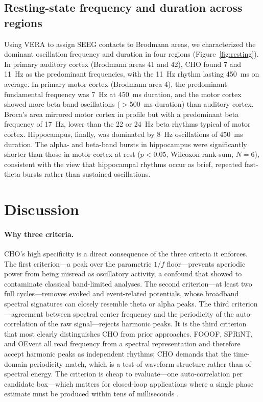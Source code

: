 \documentclass[11pt]{article}
\begin{document}
\subsection{Resting-state frequency and duration across regions}

Using VERA to assign SEEG contacts to Brodmann areas, we characterized the dominant oscillation frequency and duration in four regions (Figure~\ref{fig:resting}). In primary auditory cortex (Brodmann areas 41 and 42), CHO found 7 and 11~Hz as the predominant frequencies, with the 11~Hz rhythm lasting 450~ms on average. In primary motor cortex (Brodmann area 4), the predominant fundamental frequency was 7~Hz at 450~ms duration, and the motor cortex showed more beta-band oscillations ($>$500~ms duration) than auditory cortex. Broca's area mirrored motor cortex in profile but with a predominant beta frequency of 17~Hz, lower than the 22 or 24~Hz beta rhythms typical of motor cortex. Hippocampus, finally, was dominated by 8~Hz oscillations of 450~ms duration. The alpha- and beta-band bursts in hippocampus were significantly shorter than those in motor cortex at rest ($p < 0.05$, Wilcoxon rank-sum, $N=6$), consistent with the view that hippocampal rhythms occur as brief, repeated fast-theta bursts rather than sustained oscillations.

\section{Discussion}

\paragraph{Why three criteria.}
CHO's high specificity is a direct consequence of the three criteria it enforces. The first criterion---a peak over the parametric $1/f$ floor---prevents aperiodic power from being misread as oscillatory activity, a confound that \citet{donoghue2020parameterizing} showed to contaminate classical band-limited analyses. The second criterion---at least two full cycles---removes evoked and event-related potentials, whose broadband spectral signatures can closely resemble theta or alpha peaks. The third criterion---agreement between spectral center frequency and the periodicity of the auto-correlation of the raw signal---rejects harmonic peaks. It is the third criterion that most clearly distinguishes CHO from prior approaches. FOOOF, SPRiNT, and OEvent all read frequency from a spectral representation and therefore accept harmonic peaks as independent rhythms; CHO demands that the time-domain periodicity match, which is a test of waveform structure rather than of spectral energy. The criterion is cheap to evaluate---one auto-correlation per candidate box---which matters for closed-loop applications where a single phase estimate must be produced within tens of milliseconds \citep{cagnan2017phase,schalk2004bci2000}.
\end{document}
